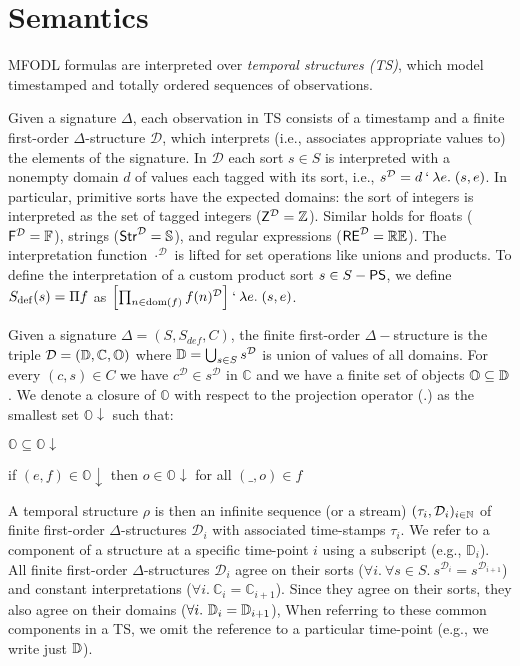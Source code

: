 \section{Semantics}
\label{sec:mfodl_semantics}
MFODL formulas are interpreted over \emph{temporal structures (TS)}, which model timestamped and totally ordered sequences of observations.

Given a signature $\Delta$, each observation in TS consists of a timestamp and a finite first-order $\Delta$-structure $\mathcal{D}$, which interprets (i.e., associates appropriate values to) the elements of the signature. In $\mathcal{D}$ each sort $s\in S$ is interpreted with a nonempty domain $d$ of values each tagged with its sort, i.e., $s^{\mathcal{D}} = d \mathbin{\text{`}} \lambda e.\; (s, e)$. In particular, primitive sorts have the expected domains: the sort of integers is interpreted as the set of tagged integers ($\mathsf{Z}^{\mathcal{D}}=\mathbb{Z}$). Similar holds for floats ($\mathsf{F}^{\mathcal{D}}=\mathbb{F}$), strings ($\mathsf{Str}^{\mathcal{D}}=\mathbb{S}$), and regular expressions ($\mathsf{RE}^{\mathcal{D}}=\mathbb{RE}$). The interpretation function $\cdot^{\mathcal{D}}$ is lifted for set operations like unions and products. To define the interpretation of a custom product sort $s \in S-\mathsf{PS}$, we define $S_{\mathrm{def}}(s)=\Pi f$ as $\left[\prod_{n\in \operatorname{dom}(f)} f(n)^{\mathcal{D}} \right] \mathbin{\text{`}} \lambda e.\; (s, e)$.

Given a signature $\Delta = (S, S_{def}, C)$, the finite first-order $\Delta-$structure is the triple
$\mathcal{D}=(\mathbb{D}, \mathbb{C}, \mathbb{O})$ where $\mathbb{D}=\bigcup_{s\in S} s^\mathcal{D}$ is
union of values of all domains. For every $(c,s)\in C$ we have $c^\mathcal{D}\in s^\mathcal{D}$ in
$\mathbb{C}$ and we have a finite set of objects $\mathbb{O}\subseteq \mathbb{D}$. We denote a closure of
$\mathbb{O}$ with respect to the projection operator ($.$) as the smallest set
$\mathbb{O}\downarrow$ such that:
\begin{compactitem}
	\item $\mathbb{O}\subseteq \mathbb{O}\downarrow$
	\item if $(e,f)\in \mathbb{O}\downarrow$ then $o\in \mathbb{O}\downarrow$ for all $(\_,o)\in f$
\end{compactitem}

A temporal structure \(\rho\) is then an infinite sequence (or a stream) \((\tau_i, \mathcal{D}_i)_{i \in \mathbb{N}}\) of finite first-order $\Delta$-structures $\mathcal{D}_i$ with associated time-stamps $\tau_i$. We refer to a component of a structure at a specific time-point $i$ using a subscript (e.g., $\mathbb{D}_i$). All finite first-order $\Delta$-structures $\mathcal{D}_i$ agree on their sorts ($\forall i.\ \forall s\in S.\ s^{\mathcal{D}_{i}}=s^{\mathcal{D}_{i+1}}$) and constant interpretations ($\forall i.\ \mathbb{C}_{i}=\mathbb{C}_{i+1}$). Since they agree on their sorts, they also agree on their domains ($\forall i.\ \mfodlDomain_i=\mfodlDomain_{i+1}$), When referring to these common components in a TS, we omit the reference to a particular time-point (e.g., we write just $\mathbb{D}$).

